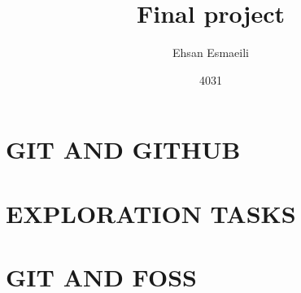 \documentclass{article}
\title{Final project}
\date{4031}
\author{Ehsan Esmaeili}
\begin{document}
\maketitle
\newpage

\section{GIT AND GITHUB}

\newpage

\section{EXPLORATION TASKS}

\newpage

\section{GIT AND FOSS}
\end{document}
